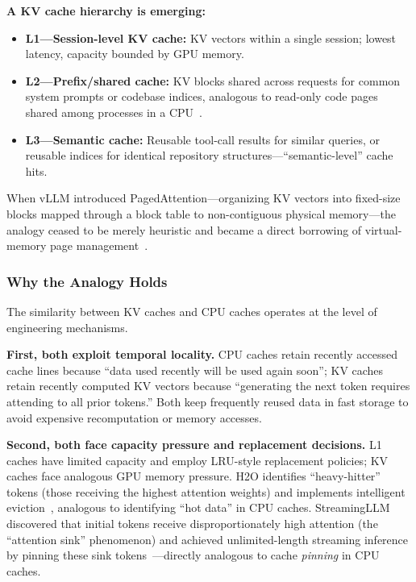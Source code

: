 \documentclass[11pt,a4paper]{article}
\begin{document}
\textbf{A KV cache hierarchy is emerging:}
\begin{itemize}[nosep]
\item \textbf{L1---Session-level KV cache:} KV vectors within a single session; lowest latency, capacity bounded by GPU memory.
\item \textbf{L2---Prefix/shared cache:} KV blocks shared across requests for common system prompts or codebase indices, analogous to read-only code pages shared among processes in a CPU~\cite{vllm_prefix_2026,sglang_docs_2026,gim2024promptcache}.
\item \textbf{L3---Semantic cache:} Reusable tool-call results for similar queries, or reusable indices for identical repository structures---``semantic-level'' cache hits.
\end{itemize}

When vLLM introduced PagedAttention---organizing KV vectors into fixed-size blocks mapped through a block table to non-contiguous physical memory---the analogy ceased to be merely heuristic and became a direct borrowing of virtual-memory page management~\cite{kwon2023pagedattention}.

\subsubsection{Why the Analogy Holds}

The similarity between KV caches and CPU caches operates at the level of engineering mechanisms.

\textbf{First, both exploit temporal locality.}
CPU caches retain recently accessed cache lines because ``data used recently will be used again soon''; KV caches retain recently computed KV vectors because ``generating the next token requires attending to all prior tokens.''
Both keep frequently reused data in fast storage to avoid expensive recomputation or memory accesses.

\textbf{Second, both face capacity pressure and replacement decisions.}
L1 caches have limited capacity and employ LRU-style replacement policies; KV caches face analogous GPU memory pressure.
H2O identifies ``heavy-hitter'' tokens (those receiving the highest attention weights) and implements intelligent eviction~\cite{h2o2023}, analogous to identifying ``hot data'' in CPU caches.
StreamingLLM discovered that initial tokens receive disproportionately high attention (the ``attention sink'' phenomenon) and achieved unlimited-length streaming inference by pinning these sink tokens~\cite{xiao2024streamingllm}---directly analogous to cache \textit{pinning} in CPU caches.
\end{document}
